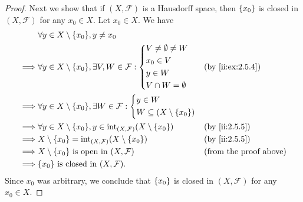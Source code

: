 \begin{proof}
  Next we show that if \((X, \mathcal{F})\) is a Hausdorff space, then \(\left\lbrace x_0\right\rbrace\) is closed in \((X, \mathcal{F})\) for any \(x_0 \in X\).
  Let \(x_0 \in X\).
  We have
  \begin{align*}
             & \forall y \in X \setminus \set{x_0}, y \neq x_0                                                                                    \\
    \implies & \forall y \in X \setminus \set{x_0}, \exists V, W \in \mathcal{F} : \begin{dcases}
                                                                                     V \neq \emptyset \neq W \\
                                                                                     x_0 \in V               \\
                                                                                     y \in W                 \\
                                                                                     V \cap W = \emptyset
                                                                                   \end{dcases}              &  & \by{ii:ex:2.5.4}                \\
    \implies & \forall y \in X \setminus \set{x_0}, \exists W \in \mathcal{F} : \begin{dcases}
                                                                                  y \in W \\
                                                                                  W \subseteq (X \setminus \set{x_0})
                                                                                \end{dcases}                                \\
    \implies & \forall y \in X \setminus \set{x_0}, y \in \text{int}_{(X, \mathcal{F})}(X \setminus \set{x_0}) &  & \by{ii:2.5.5}                 \\
    \implies & X \setminus \set{x_0} = \text{int}_{(X, \mathcal{F})}(X \setminus \set{x_0})                    &  & \by{ii:2.5.5}                 \\
    \implies & X \setminus \set{x_0} \text{ is open in } (X, \mathcal{F})                                      &  & \text{(from the proof above)} \\
    \implies & \set{x_0} \text{ is closed in } (X, \mathcal{F}).
  \end{align*}
  Since \(x_0\) was arbitrary, we conclude that \(\left\lbrace x_0\right\rbrace\) is closed in \((X, \mathcal{F})\) for any \(x_0 \in X\).


\end{proof}
